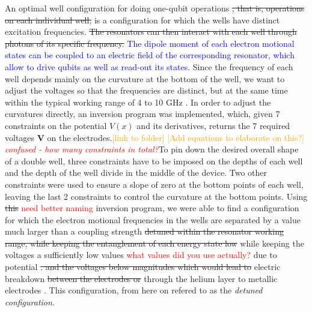 \documentclass[twocolumn,superscriptaddress,unsortedaddress,
 amsmath,amssymb,
 aps,
]{revtex4-2}
\newcommand{\may}[1]{\textcolor{orange}{#1}}
\begin{document}
        An optimal well configuration for doing one-qubit operations \st{, that is, operations on each individual well,} is a configuration for which the wells have distinct excitation frequencies. \st{The resonators can then interact with each well through photons of its specific frequency.} \textcolor{blue}{The dipole moment of each electron motional states can be coupled to an electric field of the corresponding resonator, which allow to drive qubits as well as read-out its states.} Since the frequency of each well depends mainly on the curvature at the bottom of the well, we want to adjust the voltages so that the frequencies are distinct, but at the same time within the typical working range of 4 to 10 GHz \cite{blais2020circuit}. In order to adjust the curvatures directly, 
        an inversion program was implemented, which, given 7 constraints on the potential $V(x)$ and its derivatives, returns the 7 required voltages $\boldsymbol{V}$ on the electrodes.\may{[link to folder]} \may{[Add equations to elaborate on this?]} \textcolor{red}{\textit{confused - how many constraints in total?}}To pin down the desired overall shape of a double well, three constraints have to be imposed on the depths of each well and the depth of the well divide in the middle of the device. Two other constraints were used to ensure a slope of zero at the bottom points of each well, leaving the last 2 constraints to control the curvature at the bottom points. Using \st{this} \textcolor{red}{need better naming} inversion program, we were able to find a configuration for which the electron motional frequencies in the wells are separated by a value much larger than a coupling strength \st{detuned within the resonator working range, while keeping the entanglement of each energy state low} while keeping the voltages a sufficiently low values \textcolor{red}{what values did you use actually?} due to potential \st{. and the voltages below magnitudes which would lead to} electric breakdown \st{between the electrodes or} through the helium layer to metallic electrodes \cite{Leiderer2016Stability}. This configuration, from here on refered to as the \textit{detuned configuration}.
        
\end{document}

